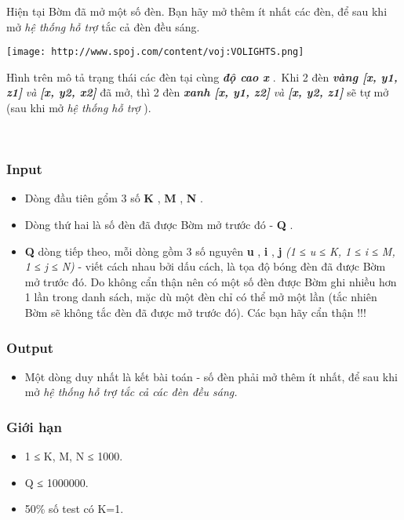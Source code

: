 Hiện tại Bờm đã mở một số đèn. Bạn hãy mở thêm ít nhất các đèn, để sau khi mở \emph{ hệ thống hỗ trợ } tắc cả đèn đều sáng.


\texttt{[image: http://www.spoj.com/content/voj:VOLIGHTS.png]}

Hình trên mô tả trạng thái các đèn tại cùng \textbf{\emph{ độ cao x }} . Khi 2 đèn \textbf{\emph{ vàng [x, y1, z1] }}\emph{ và }\textbf{\emph{ [x, y2, x2] }} đã mở, thì 2 đèn \textbf{\emph{ xanh [x, y1, z2] }}\emph{ và }\textbf{\emph{ [x, y2, z1] }} sẽ tự mở (sau khi mở \emph{ hệ thống hỗ trợ } ).

 

\subsubsection{Input}
\begin{itemize}
	\item Dòng đầu tiên gổm 3 số \textbf{ K } , \textbf{ M } , \textbf{ N } .
	\item Dòng thứ hai là số đèn đã được Bờm mở trước đó - \textbf{ Q } .
	\item \textbf{Q } dòng tiếp theo, mỗi dòng gồm 3 số nguyên \textbf{ u } , \textbf{ i } , \textbf{ j }\emph{ (1 ≤ u ≤ K, 1 ≤ i ≤ M, 1 ≤ j ≤ N) } - viết cách nhau bởi dấu cách, là tọa độ bóng đèn đã được Bờm mở trước đó. Do không cẩn thận nên có một số đèn được Bờm ghi nhiều hơn 1 lần trong danh sách, mặc dù một đèn chỉ có thể mở một lần (tắc nhiên Bờm sẽ không tắc đèn đã được mở trước đó). Các bạn hãy cẩn thận !!!
\end{itemize}

\subsubsection{Output}
\begin{itemize}
	\item Một dòng duy nhất là kết bài toán - số đèn phải mở thêm ít nhất, để sau khi mở \emph{ hệ thống hỗ trợ }\emph{ tắc cả các đèn đều sáng. }
\end{itemize}

\subsubsection{Giới hạn}
\begin{itemize}
	\item 1 ≤ K, M, N ≤ 1000.
	\item Q ≤ 1000000.
	\item 50\% số test có K=1.
\end{itemize}

